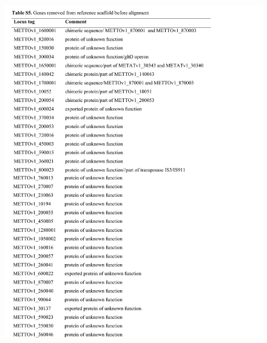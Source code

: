 \begin{figure}[H]
\centering
    \begin{singlespace}
    \includegraphics[width=1.0\textwidth]{./tex/chapter1/figures/supplemental/TableS5.pdf}
    \end{singlespace}
\end{figure}

